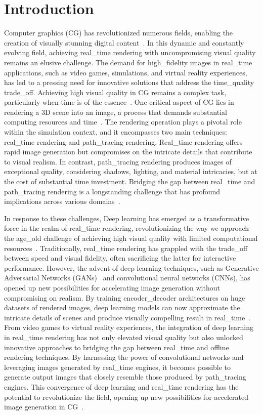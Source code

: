 \section{Introduction}
\label{sec:introduction}
Computer graphics (CG) has revolutionized numerous fields, enabling the creation of visually stunning digital content~\cite{mamurova2023role}.
In this dynamic and constantly evolving field, achieving real_time rendering with uncompromising visual quality remains an elusive challenge. The demand for high_fidelity images in real_time applications, such as video games, simulations, and virtual reality experiences, has led to a pressing need for innovative solutions that address the time_quality trade_off. Achieving high visual quality in CG remains a complex task, particularly when time is of the essence~\cite{agoston2005computer}. One critical aspect of CG lies in rendering a 3D scene into an image, a process that demands substantial computing resources and time~\cite{peresunko2021models}. The rendering operation plays a pivotal role within the simulation context, and it encompasses two main techniques: real_time rendering and path_tracing rendering. Real_time rendering offers rapid image generation but compromises on the intricate details that contribute to visual realism. In contrast, path_tracing rendering produces images of exceptional quality, considering shadows, lighting, and material intricacies, but at the cost of substantial time investment. Bridging the gap between real_time and path_tracing rendering is a longstanding challenge that has profound implications across various domains~\cite{wu2020analytic}.

In response to these challenges, Deep learning has emerged as a transformative force in the realm of real_time rendering, revolutionizing the way we approach the age_old challenge of achieving high visual quality with limited computational resources~\cite{xiao2020neural}. Traditionally, real_time rendering has grappled with the trade_off between speed and visual fidelity, often sacrificing the latter for interactive performance. However, the advent of deep learning techniques, such as Generative Adversarial Networks (GANs)~\cite{goodfellow2020generative} and convolutional neural networks (CNNs), has opened up new possibilities for accelerating image generation without compromising on realism. By training encoder_decoder architectures on huge datasets of rendered images, deep learning models can now approximate the intricate details of scenes and produce visually compelling result in real_time~\cite{shi2021towards}. From video games to virtual reality experiences, the integration of deep learning in real_time rendering has not only elevated visual quality but also unlocked innovative approaches to bridging the gap between real_time and offline rendering techniques. By harnessing the power of convolutional networks and leveraging images generated by real_time engines, it becomes possible to generate output images that closely resemble those produced by path_tracing engines. This convergence of deep learning and real_time rendering has the potential to revolutionize the field, opening up new possibilities for accelerated image generation in CG~\cite{shi2021towards}.

